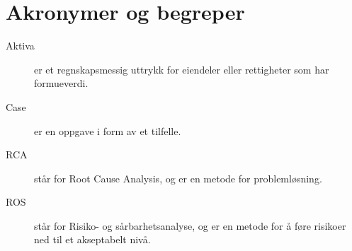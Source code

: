 \chapter*{Akronymer og begreper}
\label{kap:akronymer}

\begin{description}
    \item[Aktiva] er et regnskapsmessig uttrykk for eiendeler eller rettigheter som har formueverdi.
    \item[Case] er en oppgave i form av et tilfelle.
    \item[RCA] står for Root Cause Analysis, og er en metode for problemløsning.
    \item[ROS] står for Risiko- og sårbarhetsanalyse, og er en metode for å føre risikoer ned til et akseptabelt nivå.
\end{description}